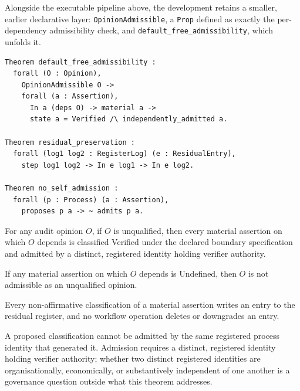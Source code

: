 \documentclass[smallcondensed,envcountsect,natbib]{svjour3}
\newcommand{\state}[1]{\textsf{#1}}
\begin{document}
Alongside the executable pipeline above, the development retains a smaller, earlier declarative layer: \texttt{OpinionAdmissible}, a \texttt{Prop} defined as exactly the per-dependency admissibility check, and \texttt{default\_free\_admissibility}, which unfolds it.

\begin{lstlisting}
Theorem default_free_admissibility :
  forall (O : Opinion),
    OpinionAdmissible O ->
    forall (a : Assertion),
      In a (deps O) -> material a ->
      state a = Verified /\ independently_admitted a.

Theorem residual_preservation :
  forall (log1 log2 : RegisterLog) (e : ResidualEntry),
    step log1 log2 -> In e log1 -> In e log2.

Theorem no_self_admission :
  forall (p : Process) (a : Assertion),
    proposes p a -> ~ admits p a.
\end{lstlisting}

\begin{theorem}
\label{thm:main}
For any audit opinion $O$, if $O$ is unqualified, then every material assertion on which $O$ depends is classified \state{Verified} under the declared boundary specification and admitted by a distinct, registered identity holding verifier authority.
\end{theorem}

\begin{corollary}[Contrapositive]
\label{cor:contra}
If any material assertion on which $O$ depends is \state{Undefined}, then $O$ is not admissible as an unqualified opinion.
\end{corollary}

\begin{theorem}
\label{thm:residual}
Every non-affirmative classification of a material assertion writes an entry to the residual register, and no workflow operation deletes or downgrades an entry.
\end{theorem}

\begin{theorem}
\label{thm:selfadmission}
A proposed classification cannot be admitted by the same registered process identity that generated it. Admission requires a distinct, registered identity holding verifier authority; whether two distinct registered identities are organisationally, economically, or substantively independent of one another is a governance question outside what this theorem addresses.
\end{theorem}
\end{document}

